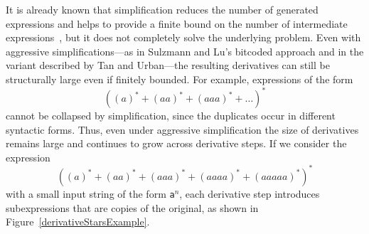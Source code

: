 \documentclass[12pt]{article}
\begin{document}
It is already known that simplification reduces the number of generated
expressions and helps to provide a finite bound on the number of intermediate
expressions~\cite{Sulzmann2014,TanAndUrban2023}, but it does not completely
solve the underlying problem. Even with aggressive simplifications---as in
Sulzmann and Lu’s bitcoded approach and in the variant described by Tan and
Urban---the resulting derivatives can still be structurally large even if
finitely bounded. For example, expressions of the form
\[
((a)^* + (aa)^* + (aaa)^* + \dots )^*
\]
cannot be collapsed by simplification, since the duplicates occur in different
syntactic forms. Thus, even under aggressive simplification the size of
derivatives remains large and continues to grow across derivative steps.
If we consider the expression
\[
((a)^* + (aa)^* + (aaa)^* + (aaaa)^* + (aaaaa)^*)^*
\]
with a small input string of the form \texttt{a}$^n$, each derivative step
introduces subexpressions that are copies of the original, as shown in Figure~\ref{derivativeStarsExample}.
\end{document}
